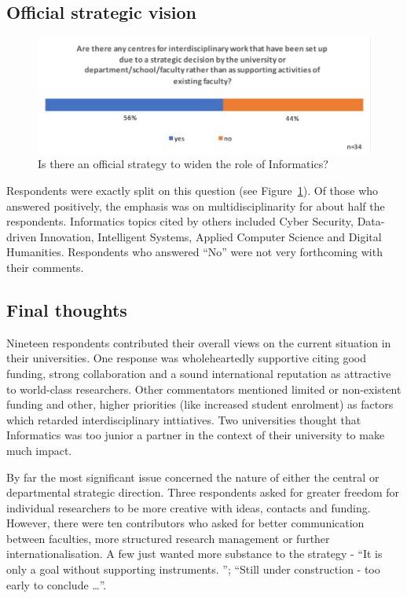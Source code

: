 \subsection{Official strategic vision}
\begin{figure}[h]
\centering
\includegraphics[width = \linewidth]{charts/5i.jpg}
\caption{Is there an official strategy to widen the role of Informatics?}
\label{sect5:official}
\end{figure}

Respondents were exactly split on this question (see Figure~\ref{sect5:official}). Of those who answered positively, the emphasis was on multidisciplinarity for about half the respondents. Informatics topics cited by others included Cyber Security, Data-driven Innovation, Intelligent Systems, Applied Computer Science and Digital Humanities. Respondents who answered ``No'' were not very forthcoming with their comments.

\subsection{Final thoughts}

Nineteen respondents contributed their overall views on the current situation in their universities. One response was wholeheartedly supportive citing good funding, strong collaboration and a sound international reputation as attractive to world-class researchers. Other commentators mentioned limited or non-existent funding and other, higher priorities (like increased student enrolment) as factors which retarded interdisciplinary inttiatives. Two universities thought that Informatics was too junior a partner in the context of their university to make much impact.

By far the most significant issue concerned the nature of either the central or departmental strategic direction. Three respondents asked for greater freedom for individual researchers to be more creative with ideas, contacts and funding.  However, there were ten contributors who asked for better communication between faculties, more structured research management or further internationalisation. A few just wanted more substance to the strategy - ``It is only a goal without supporting instruments. '';  ``Still under construction - too early to conclude \ldots ''.




